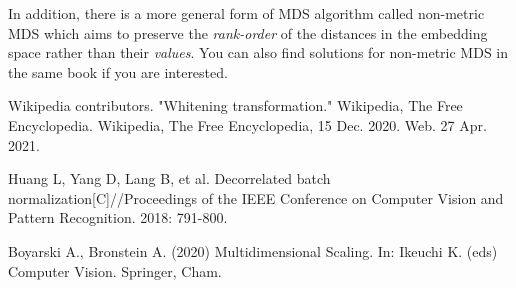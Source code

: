 \documentclass[UTF-8]{ctexart}
\theoremstyle{definition}
\theoremstyle{definition}
\theoremstyle{remark}
\begin{document}
In addition, there is a more general form of MDS algorithm called non-metric MDS which aims to preserve the \emph{rank-order} of the distances in the embedding space rather than their \emph{values}. You can also find solutions for non-metric MDS in the same book\cite{MDS} if you are interested.

\begin{thebibliography}{1}


Wikipedia contributors. "Whitening transformation." Wikipedia, The Free Encyclopedia. Wikipedia, The Free Encyclopedia, 15 Dec. 2020. Web. 27 Apr. 2021. 


Huang L, Yang D, Lang B, et al. Decorrelated batch normalization[C]//Proceedings of the IEEE Conference on Computer Vision and Pattern Recognition. 2018: 791-800.


Boyarski A., Bronstein A. (2020) Multidimensional Scaling. In: Ikeuchi K. (eds) Computer Vision. Springer, Cham. 

\end{thebibliography}
\end{document}
